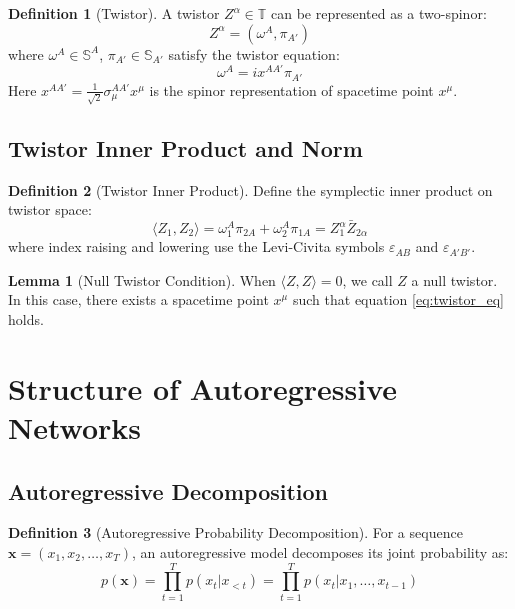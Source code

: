 \documentclass[12pt,a4paper]{article}
\theoremstyle{definition}
\newtheorem{definition}{Definition}[section]
\newtheorem{lemma}{Lemma}[section]
\begin{document}
\begin{definition}[Twistor]
A twistor $Z^\alpha \in \mathbb{T}$ can be represented as a two-spinor:
\begin{equation}
Z^\alpha = (\omega^A, \pi_{A'})
\end{equation}
where $\omega^A \in \mathbb{S}^A$, $\pi_{A'} \in \mathbb{S}_{A'}$ satisfy the twistor equation:
\begin{equation}\label{eq:twistor_eq}
\omega^A = i x^{AA'} \pi_{A'}
\end{equation}
Here $x^{AA'} = \frac{1}{\sqrt{2}} \sigma_\mu^{AA'} x^\mu$ is the spinor representation of spacetime point $x^\mu$.
\end{definition}

\subsection{Twistor Inner Product and Norm}

\begin{definition}[Twistor Inner Product]
Define the symplectic inner product on twistor space:
\begin{equation}\label{eq:twistor_inner}
\langle Z_1, Z_2 \rangle = \omega_1^A \pi_{2A} + \omega_2^A \pi_{1A} = Z_1^\alpha \bar{Z}_{2\alpha}
\end{equation}
where index raising and lowering use the Levi-Civita symbols $\varepsilon_{AB}$ and $\varepsilon_{A'B'}$.
\end{definition}

\begin{lemma}[Null Twistor Condition]
When $\langle Z, Z \rangle = 0$, we call $Z$ a null twistor. In this case, there exists a spacetime point $x^\mu$ such that equation \eqref{eq:twistor_eq} holds.
\end{lemma}

\section{Structure of Autoregressive Networks}

\subsection{Autoregressive Decomposition}

\begin{definition}[Autoregressive Probability Decomposition]
For a sequence $\mathbf{x} = (x_1, x_2, \ldots, x_T)$, an autoregressive model decomposes its joint probability as:
\begin{equation}\label{eq:autoregressive}
p(\mathbf{x}) = \prod_{t=1}^{T} p(x_t | x_{<t}) = \prod_{t=1}^{T} p(x_t | x_1, \ldots, x_{t-1})
\end{equation}
\end{definition}
\end{document}

